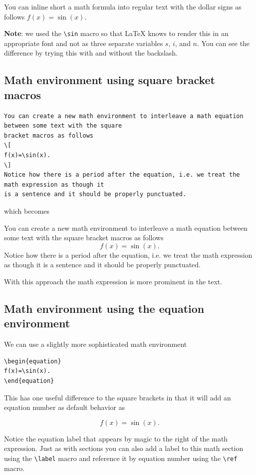 \begin{tcolorbox}
You can inline short a math formula into regular text with the dollar signs as follows $f(x)=\sin(x)$.
\end{tcolorbox}

{\bf Note}: we used the \verb|\sin| macro so that \LaTeX{} knows to render this in an appropriate font and not as three separate variables $s$, $i$, and $n$. You can see the difference by trying this with and without the backslash.

\subsection{Math environment using square bracket macros}

\begin{verbatim}
You can create a new math environment to interleave a math equation between some text with the square
bracket macros as follows 
\[
f(x)=\sin(x).
\]
Notice how there is a period after the equation, i.e. we treat the math expression as though it
is a sentence and it should be properly punctuated.
\end{verbatim}
which becomes

\begin{tcolorbox}
You can create a new math environment to interleave a math equation between some text with the square bracket macros as follows 
\[
f(x)=\sin(x).
\]
Notice how there is a period after the equation, i.e. we treat the math expression as though it is a sentence and it should be properly punctuated.
\end{tcolorbox}

With this approach the math expression is more prominent in the text. 

\subsection{Math environment using the equation environment}

We can use a slightly more sophisticated math environment 
\begin{verbatim}
\begin{equation}
f(x)=\sin(x).
\end{equation}
\end{verbatim}
This has one useful difference to the square brackets in that it will add an equation number as default behavior as 
\begin{tcolorbox}
\begin{equation}
f(x)=\sin(x).
\end{equation}
\end{tcolorbox}
Notice the equation label that appears by magic to the right of the math expression. Just as with sections you can also add a label to this math section using the \verb|\label| macro and reference it by equation number using the \verb|\ref| macro.

